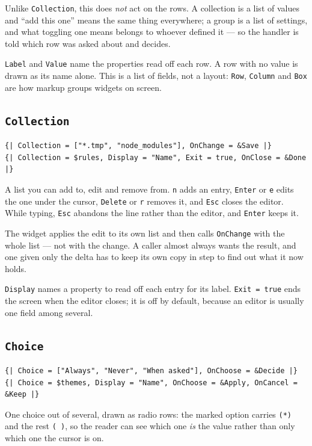 \documentclass[11pt,a4paper,twoside,openany]{book}
\newcommand{\code}[1]{\texttt{\small #1}}
\begin{document}
Unlike \code{Collection}, this does \emph{not} act on the rows. A collection is a
list of values and ``add this one'' means the same thing everywhere; a group is a
list of settings, and what toggling one means belongs to whoever defined it --- so
the handler is told which row was asked about and decides.

\code{Label} and \code{Value} name the properties read off each row. A row with no
value is drawn as its name alone. This is a list of fields, not a layout: \code{Row},
\code{Column} and \code{Box} are how markup groups widgets on screen.

\subsection{\texttt{Collection}}

\begin{lstlisting}
{| Collection = ["*.tmp", "node_modules"], OnChange = &Save |}
{| Collection = $rules, Display = "Name", Exit = true, OnClose = &Done |}
\end{lstlisting}

A list you can add to, edit and remove from. \code{n} adds an entry, \code{Enter}
or \code{e} edits the one under the cursor, \code{Delete} or \code{r} removes it,
and \code{Esc} closes the editor. While typing, \code{Esc} abandons the line rather
than the editor, and \code{Enter} keeps it.

The widget applies the edit to its own list and then calls \code{OnChange} with the
whole list --- not with the change. A caller almost always wants the result, and one
given only the delta has to keep its own copy in step to find out what it now holds.

\code{Display} names a property to read off each entry for its label. \code{Exit =
true} ends the screen when the editor closes; it is off by default, because an
editor is usually one field among several.

\subsection{\texttt{Choice}}

\begin{lstlisting}
{| Choice = ["Always", "Never", "When asked"], OnChoose = &Decide |}
{| Choice = $themes, Display = "Name", OnChoose = &Apply, OnCancel = &Keep |}
\end{lstlisting}

One choice out of several, drawn as radio rows: the marked option carries
\code{(*)} and the rest \code{( )}, so the reader can see which one \emph{is} the
value rather than only which one the cursor is on.
\end{document}
